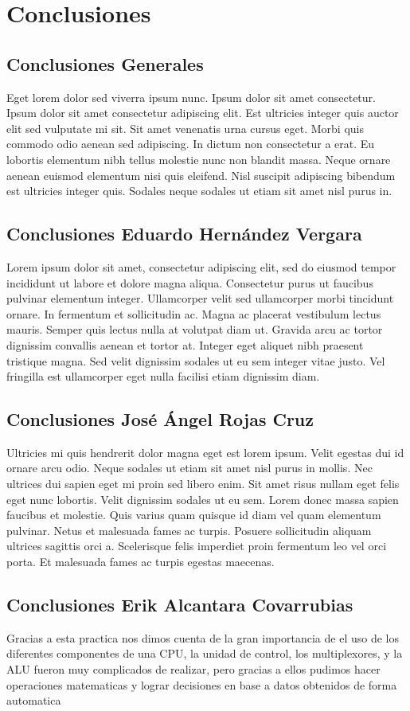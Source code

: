 \section{Conclusiones}
	\subsection{Conclusiones Generales}
	Eget lorem dolor sed viverra ipsum nunc. Ipsum dolor sit amet consectetur. Ipsum dolor sit amet consectetur adipiscing elit. Est ultricies integer quis auctor elit sed vulputate mi sit. Sit amet venenatis urna cursus eget. Morbi quis commodo odio aenean sed adipiscing. In dictum non consectetur a erat. Eu lobortis elementum nibh tellus molestie nunc non blandit massa. Neque ornare aenean euismod elementum nisi quis eleifend. Nisl suscipit adipiscing bibendum est ultricies integer quis. Sodales neque sodales ut etiam sit amet nisl purus in.
	\subsection{Conclusiones Eduardo Hern\'andez Vergara}
		Lorem ipsum dolor sit amet, consectetur adipiscing elit, sed do eiusmod tempor incididunt ut labore et dolore magna aliqua. Consectetur purus ut faucibus pulvinar elementum integer. Ullamcorper velit sed ullamcorper morbi tincidunt ornare. In fermentum et sollicitudin ac. Magna ac placerat vestibulum lectus mauris. Semper quis lectus nulla at volutpat diam ut. Gravida arcu ac tortor dignissim convallis aenean et tortor at. Integer eget aliquet nibh praesent tristique magna. Sed velit dignissim sodales ut eu sem integer vitae justo. Vel fringilla est ullamcorper eget nulla facilisi etiam dignissim diam.
	\subsection{Conclusiones Jos\'e \'Angel Rojas Cruz}
	Ultricies mi quis hendrerit dolor magna eget est lorem ipsum. Velit egestas dui id ornare arcu odio. Neque sodales ut etiam sit amet nisl purus in mollis. Nec ultrices dui sapien eget mi proin sed libero enim. Sit amet risus nullam eget felis eget nunc lobortis. Velit dignissim sodales ut eu sem. Lorem donec massa sapien faucibus et molestie. Quis varius quam quisque id diam vel quam elementum pulvinar. Netus et malesuada fames ac turpis. Posuere sollicitudin aliquam ultrices sagittis orci a. Scelerisque felis imperdiet proin fermentum leo vel orci porta. Et malesuada fames ac turpis egestas maecenas.
	\subsection{Conclusiones Erik Alcantara Covarrubias }
Gracias a esta practica nos dimos cuenta de la gran importancia de el uso de los diferentes componentes de una CPU, la unidad de control, los multiplexores, y la ALU fueron muy complicados de realizar, pero gracias a ellos pudimos hacer operaciones matematicas y lograr decisiones en base a datos obtenidos de forma automatica
